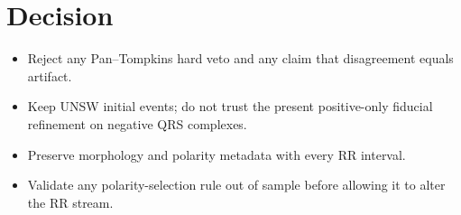 \documentclass[10pt]{article}
\begin{document}

\section{Decision}
\begin{itemize}
\item Reject any Pan--Tompkins hard veto and any claim that disagreement equals artifact.
\item Keep UNSW initial events; do not trust the present positive-only fiducial refinement on negative QRS complexes.
\item Preserve morphology and polarity metadata with every RR interval.
\item Validate any polarity-selection rule out of sample before allowing it to alter the RR stream.
\end{itemize}

\begingroup{}


\endgroup
\end{document}
